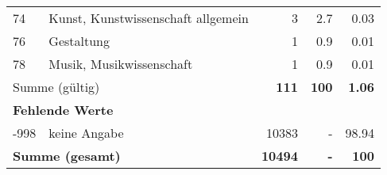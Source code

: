 \begin{longtable}{lXrrr}
        74 & \multicolumn{1}{X}{Kunst, Kunstwissenschaft allgemein} & %
          \num{3} &
          \num[round-mode=places,round-precision=2]{2.7} &
          \num[round-mode=places,round-precision=2]{0.03} \\

        76 & \multicolumn{1}{X}{Gestaltung} & %
          \num{1} &
          \num[round-mode=places,round-precision=2]{0.9} &
          \num[round-mode=places,round-precision=2]{0.01} \\

        78 & \multicolumn{1}{X}{Musik, Musikwissenschaft} & %
          \num{1} &
          \num[round-mode=places,round-precision=2]{0.9} &
          \num[round-mode=places,round-precision=2]{0.01} \\

     \midrule
     \multicolumn{2}{l}{Summe (gültig)} &
       \textbf{\num{111}} &
     \textbf{\num{100}} &
       \textbf{\num[round-mode=places,round-precision=2]{1.06}} \\
     \multicolumn{5}{l}{\textbf{Fehlende Werte}}\\
       -998 &
       keine Angabe &
         \num{10383} &
        - &
         \num[round-mode=places,round-precision=2]{98.94} \\
     \midrule
     \multicolumn{2}{l}{\textbf{Summe (gesamt)}} &
          \textbf{\num{10494}} &
        \textbf{-} &
        \textbf{\num{100}} \\
     \bottomrule
     \end{longtable}
     

